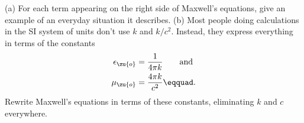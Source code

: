         (a) For each term appearing on the right side of Maxwell's equations, give
        an example of an everyday situation it describes.\hwendpart
        (b) Most people doing calculations in the SI system of units don't use
        $k$ and $k/c^2$. Instead, they express everything in terms of
        the constants
        \begin{align*}
                \epsilon_\zu{o}&=\frac{1}{4\pi k} \qquad \text{and} \\
                 \mu_\zu{o}&=\frac{4\pi k}{c^2}\eqquad.
        \end{align*}
        Rewrite Maxwell's equations in terms of these constants, eliminating
        $k$ and $c$ everywhere.
